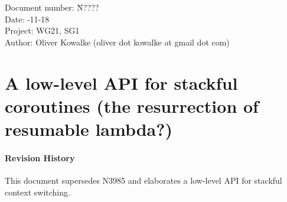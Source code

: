 \documentclass[a4paper,10pt,DIV15]{scrartcl}
\begin{document}
\small
\begin{tabbing}
    Document number: \= N????\\
    Date:            -11-18\\
    Project:         \> WG21, SG1\\
    Author:          \> Oliver Kowalke (oliver dot kowalke at gmail dot com)\\
\end{tabbing}

\section*{A low-level API for stackful coroutines (the resurrection of resumable lambda?)}


\tableofcontents


\paragraph*{Revision History}
This document supersedes N3985 and elaborates a low-level API for stackful
context switching.













\end{document}
